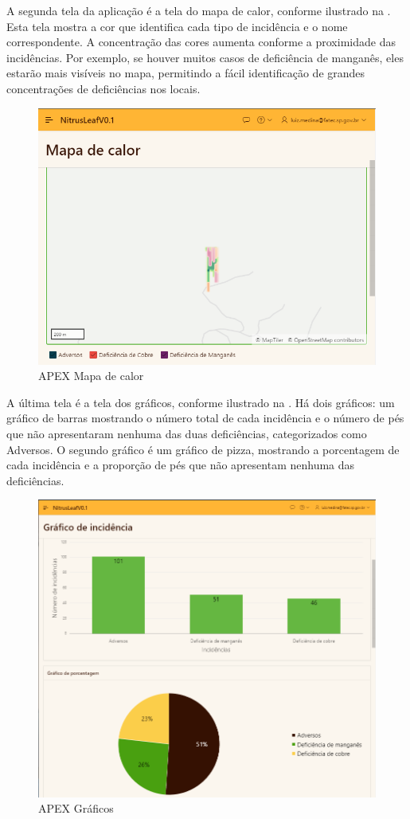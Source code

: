 \documentclass[
    a4paper,%
    12pt,%
    english,%
    brazilian,%
]{article}
\begin{document}
A segunda tela da aplicação é a tela do mapa de calor, conforme ilustrado na . Esta tela mostra a cor que identifica cada tipo de incidência e o nome correspondente. A concentração das cores aumenta conforme a proximidade das incidências. Por exemplo, se houver muitos casos de deficiência de manganês, eles estarão mais visíveis no mapa, permitindo a fácil identificação de grandes concentrações de deficiências nos locais.

\begin{figure}[H]
\centering
\caption{APEX Mapa de calor}%
\label{fig:APEX-mapa-de-calor}
\includegraphics[width=0.8\linewidth]{Logos/mapadecalor.png}
\end{figure}

A última tela é a tela dos gráficos, conforme ilustrado na . Há dois gráficos: um gráfico de barras mostrando o número total de cada incidência e o número de pés que não apresentaram nenhuma das duas deficiências, categorizados como Adversos. O segundo gráfico é um gráfico de pizza, mostrando a porcentagem de cada incidência e a proporção de pés que não apresentam nenhuma das deficiências.

\begin{figure}[H]
\centering
\caption{APEX Gráficos}%
\label{fig:grafico}
\includegraphics[width=0.8\linewidth]{Logos/grafico.png}
\end{figure}
\end{document}
